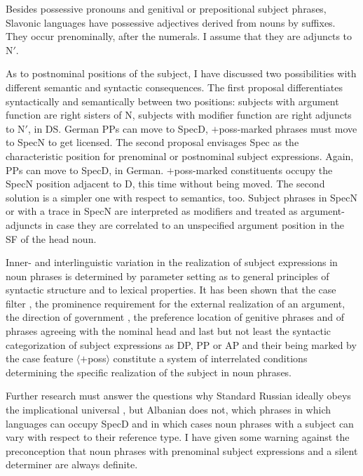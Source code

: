 \documentclass[output=paper,colorlinks,citecolor=brown]{langscibook}
\begin{document}
Besides possessive pronouns and genitival or prepositional subject phrases, Slavonic languages have possessive adjectives derived from nouns by suffixes. They occur prenominally, after the numerals. I assume that they are adjuncts to N$'$.

As to postnominal positions of the subject, I have discussed two possibilities with different semantic and syntactic consequences. The first proposal differentiates syntactically and semantically between two positions: subjects with argument function are right sisters of N, subjects with modifier function are right adjuncts to N$'$, in DS. German PPs can move to SpecD, $+$poss-marked phrases must move to SpecN to get licensed. The second proposal envisages Spec as the characteristic position for prenominal or postnominal subject expressions. Again, PPs can move to SpecD, in German. $+$poss-marked constituents occupy the SpecN position adjacent to D, this time without being moved. The second solution is a simpler one with respect to semantics, too. Subject phrases in SpecN or with a trace in SpecN are interpreted as modifiers and treated as argument-adjuncts in case they are correlated to an unspecified argument position in the SF of the head noun.

Inner- and interlinguistic variation in the realization of subject expressions in noun phrases is determined by parameter setting as to general principles of syntactic structure and to lexical properties. It has been shown that the case filter , the prominence requirement  for the external realization of an argument, the direction of government , the preference location of genitive phrases and of phrases agreeing with the nominal head  and last but not least the syntactic categorization of subject expressions as DP, PP or AP and their being marked by the case feature $\langle +$poss$\rangle$ constitute a system of interrelated conditions determining the specific realization of the subject in noun phrases.

Further research must answer the questions why Standard Russian ideally obeys the implicational universal , but Albanian does not, which phrases in which languages can occupy SpecD and in which cases noun phrases with a subject can vary with respect to their reference type. I have given some warning against the preconception that noun phrases with prenominal subject expressions and a silent determiner are always definite.
\end{document}
